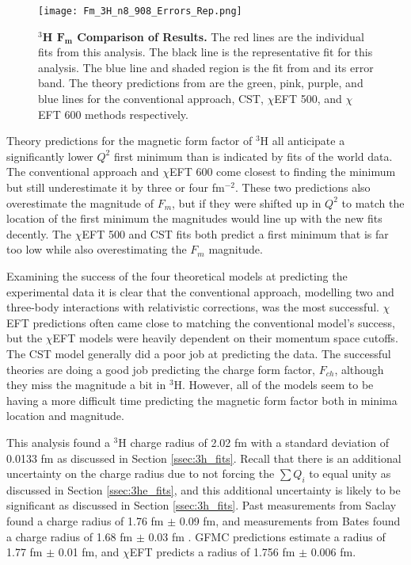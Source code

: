 \begin{figure}[!ht]
	\begin{center}
	\texttt{[image: Fm\_3H\_n8\_908\_Errors\_Rep.png]}
	\end{center}
	\caption[$^3$H $F_m$ Comparison of Results]{
	{\bf{$^3$H $\boldsymbol{F_m}$ Comparison of Results.}} The red lines are the individual fits from this analysis. The black line is the representative fit for this analysis. The blue line and shaded region is the fit from \cite{Article:Amroun} and its error band. The theory predictions from \cite{Article:Marcucci} are the green, pink, purple, and blue lines for the conventional approach, CST, $\chi$EFT 500, and $\chi$EFT 600 methods respectively.}
	\label{fig:3h_fm_theory}
\end{figure}

Theory predictions for the magnetic form factor of $^3$H all anticipate a significantly lower $Q^2$ first minimum than is indicated by fits of the world data. The conventional approach and $\chi$EFT 600 come closest to finding the minimum but still underestimate it by three or four fm$^{-2}$. These two predictions also overestimate the magnitude of $F_m$, but if they were shifted up in $Q^2$ to match the location of the first minimum the magnitudes would line up with the new fits decently. The $\chi$EFT 500 and CST fits both predict a first minimum that is far too low while also overestimating the $F_m$ magnitude. 

Examining the success of the four theoretical models at predicting the experimental data it is clear that the conventional approach, modelling two and three-body interactions with relativistic corrections, was the most successful. $\chi$EFT predictions often came close to matching the conventional model's success, but the $\chi$EFT models were heavily dependent on their momentum space cutoffs. The CST model generally did a poor job at predicting the data. The successful theories are doing a good job predicting the charge form factor, $F_{ch}$, although they miss the magnitude a bit in $^3$H. However, all of the models seem to be having a more difficult time predicting the magnetic form factor both in minima location and magnitude.

This analysis found a $^3$H charge radius of 2.02 fm with a standard deviation of 0.0133 fm as discussed in Section \ref{ssec:3h_fits}. Recall that there is an additional uncertainty on the charge radius due to not forcing the $\sum Q_i$ to equal unity as discussed in Section \ref{ssec:3he_fits}, and this additional uncertainty is likely to be significant as discussed in Section \ref{ssec:3h_fits}. Past measurements from Saclay found a charge radius of 1.76 fm $\pm$ 0.09 fm, and measurements from Bates found a charge radius of 1.68 fm $\pm$ 0.03 fm \cite{3h_proposal}. GFMC predictions estimate a radius of 1.77 fm $\pm$ 0.01 fm, and $\chi$EFT predicts a radius of 1.756 fm $\pm$ 0.006 fm. 

